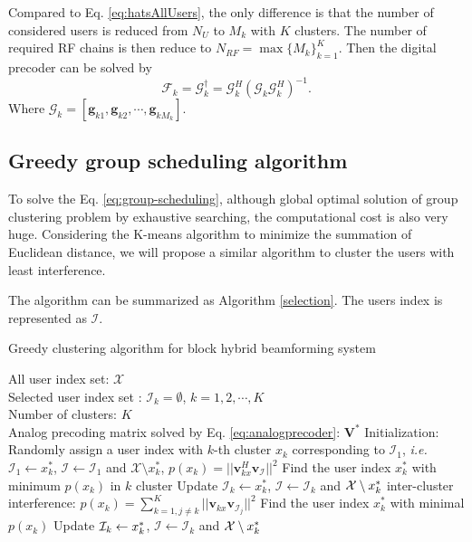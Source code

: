 \documentclass[conference]{IEEEtran}
\begin{document}
Compared to Eq. \eqref{eq:hatsAllUsers}, the only difference is that the number of considered users is reduced from $N_U$ to $M_k$ with $K$ clusters. The number of required RF chains is then reduce to $N_{RF} = \max \{M_k\}_{k=1}^K$. Then the digital precoder can be solved by
\begin{equation}
\bm{\mathcal{F}}_k = \bm{\mathcal{G}}_k^\dagger = \bm{\mathcal{G}}_k^H(\bm{\mathcal{G}}_k \bm{\mathcal{G}}_k^H)^{-1}.
\end{equation}
Where $\bm{\mathcal{G}}_k = [\bm{g}_{k1}, \bm{g}_{k2},\cdots,\bm{g}_{kM_k}]$.





\subsection{Greedy group scheduling algorithm}
To solve the Eq. \eqref{eq:group-scheduling}, although global optimal solution of group clustering problem by exhaustive searching, the computational cost is also very huge. Considering the K-means algorithm to minimize the summation of Euclidean distance, we will propose a similar algorithm to cluster the users with least interference.

The algorithm can be summarized as Algorithm \ref{selection}. The users index is represented as $\bm{\mathcal{I}}$.
\begin{algorithm}[h] 		
	\caption{Greedy clustering algorithm for block hybrid beamforming system}
	\label{selection}
	\begin{algorithmic}
		\REQUIRE  \quad
		\STATE	All user index set: $\mathcal{X}$\\
		\STATE  Selected user index set : $\mathcal{I}_k=\emptyset$, $k=1,2,\cdots, K$\\
		\STATE  Number of clusters: $K$\\
		\STATE Analog precoding matrix solved by Eq. \eqref{eq:analogprecoder}: $\bm{V}^*$ 
		\ENSURE   	
		\STATE Initialization: Randomly assign a user index with $k$-th cluster $x_k$ corresponding to ${\mathcal I}_1$, {\em i.e.} $\mathcal{I}_1 \leftarrow  x^*_k$,  $\bm{\mathcal{I}} \leftarrow \mathcal{I}_1$ and ${\mathcal X}\setminus x_k^*$, 
		\STATE $p(x_k) = ||\bm{v}_{kx}^H \bm{v}_{\bm{\mathcal{I}}}||^2$
		\ENDFOR
		\STATE Find the user index $x_k^*$ with minimum $p(x_k)$ in $k$ cluster
		\STATE Update $\mathcal{I}_k\leftarrow x_k^*$, $\bm{\mathcal{I}}\leftarrow \mathcal{I}_k$ and  ${\cal X}\setminus x_k^*$
		\ENDWHILE
		\STATE  inter-cluster interference: $p(x_k)= \sum_{k=1,j\neq k}^{K}||\bm{v}_{kx}\bm{v}_{\mathcal{I}_j}||^2$					 								
		\ENDWHILE
		\STATE Find the user index $x_k^*$ with minimal $p(x_k)$									
		\STATE	Update ${\cal I}_k \leftarrow  x_k^*$, $\bm{\mathcal{I}}\leftarrow \mathcal{I}_k$ and ${\cal X}\setminus x_k^*$	
		\ENDFOR	
	\end{algorithmic}
\end{algorithm}
\end{document}
